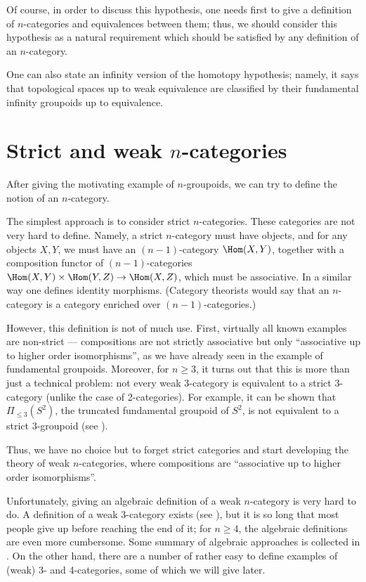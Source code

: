 Of course, in order to discuss this hypothesis, one needs first to give a
definition of $n$-categories and equivalences between them; thus, we should
consider this hypothesis as a natural requirement which should be satisfied by
any definition of an $n$-category.

One can also state an infinity version of the homotopy hypothesis; namely, it
says that topological spaces up to weak equivalence are classified by their
fundamental infinity groupoids up to equivalence.

\section{Strict and weak $n$-categories}\label{s:strict-n-cat}
After giving the motivating example of $n$-groupoids, we can try to
define the notion of an $n$-category.

The simplest approach is to consider strict $n$-categories. These categories are
not very hard to define. Namely, a strict $n$-category must have objects, and
for any objects $X,Y$, we must have an $(n-1)$-category $\Hom (X,Y)$, together
with a composition functor of $(n-1)$-categories $\Hom(X,Y)\times \Hom(Y,Z)\to
\Hom(X,Z)$, which must be associative. In a similar way one defines identity
morphisms. (Category theorists would say that an
$n$-category is a category enriched over $(n-1)$-categories.)

However, this definition is not of much use. First, virtually all known examples
are non-strict --- compositions are not strictly associative but only
``associative up to higher order isomorphisms'', as we have already seen in the
example of fundamental groupoids. Moreover, for $n\ge 3$, it turns out that this
is more than just a technical problem: not every weak 3-category is equivalent
to a strict 3-category (unlike the case of 2-categories). For example, it can be
shown that $\Pi_{\leq 3}(S^2)$, the truncated fundamental
groupoid of $S^2$, is not equivalent to a strict 3-groupoid (see
\cite[Theorem 2.7.2]{simpson}).



Thus, we have no choice but to forget strict categories and start developing the
theory of weak $n$-categories, where compositions are ``associative up to
higher order isomorphisms''.


Unfortunately, giving an algebraic definition of a weak $n$-category is very
hard to do. A definition of a weak 3-category exists (see
\cite{gordon-power-street}), but it is so long that most people give up before
reaching the end of it; for $n\ge 4$, the algebraic definitions are even more
cumbersome. Some summary of algebraic approaches is collected in
\cite{leinster}. On the other hand, there are a number of rather easy to
define examples of (weak) 3- and 4-categories, some of which we will give
later.


